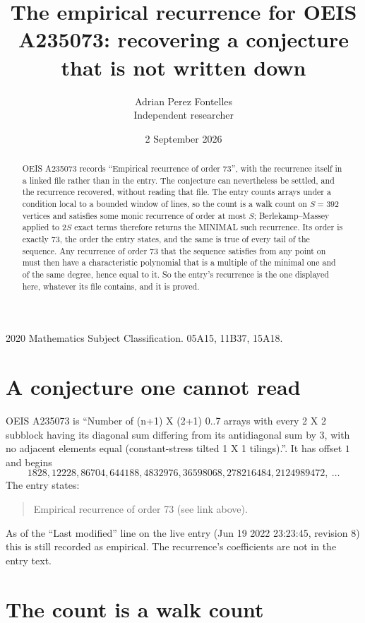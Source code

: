 \documentclass[11pt,a4paper]{article}
\title{The empirical recurrence for OEIS A235073: recovering a conjecture that is not written down}
\author{Adrian Perez Fontelles\\ \small Independent researcher}
\date{2 September 2026}
\theoremstyle{plain}
\theoremstyle{definition}
\begin{document}
\maketitle

\begin{abstract}
OEIS A235073 records ``Empirical recurrence of order $73$'', with the recurrence itself in a
linked file rather than in the entry. The conjecture can nevertheless be settled, and the
recurrence recovered, without reading that file. The entry counts arrays under a condition
local to a bounded window of lines, so the count is a walk count on $S=392$ vertices and
satisfies some monic recurrence of order at most $S$; Berlekamp--Massey applied to $2S$ exact
terms therefore returns the MINIMAL such recurrence. Its order is exactly $73$, the order
the entry states, and the same is true of every tail of the sequence. Any recurrence of order
$73$ that the sequence satisfies from any point on must then have a characteristic
polynomial that is a multiple of the minimal one and of the same degree, hence equal to it. So
the entry's recurrence is the one displayed here, whatever its file contains, and it is
proved.
\end{abstract}

\noindent\small 2020 Mathematics Subject Classification. 05A15, 11B37, 15A18.\normalsize

\section{A conjecture one cannot read}

OEIS A235073 is ``Number of (n+1) X (2+1) 0..7 arrays with every 2 X 2 subblock having its diagonal sum differing from its antidiagonal sum by 3, with no adjacent elements equal (constant-stress tilted 1 X 1 tilings).''. It has offset $1$ and begins
\[
1828, 12228, 86704, 644188, 4832976, 36598068, 278216484, 2124989472,\ \dots
\]
The entry states:
\begin{quote}
Empirical recurrence of order 73 (see link above).
\end{quote}
As of the ``Last modified'' line on the live entry (Jun 19 2022 23:23:45, revision 8) this is still
recorded as empirical. The recurrence's coefficients are not in the entry text.

\section{The count is a walk count}
\end{document}
